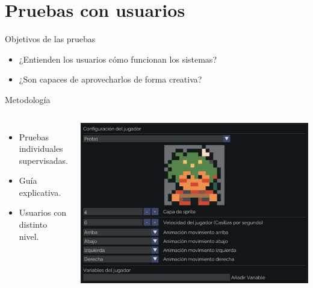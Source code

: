 \documentclass[aspectratio=169]{beamer}
\begin{document}
\section{Pruebas con usuarios}
\begin{frame}{Objetivos de las pruebas}
	\begin{itemize}
		\item ¿Entienden los usuarios cómo funcionan los sistemas?
		\item ¿Son capaces de aprovecharlos de forma creativa?
	\end{itemize}
\end{frame}
\begin{frame}{Metodología}
\begin{columns}
	\begin{itemize}
		\item Pruebas individuales supervisadas.
		\item Guía explicativa.
		\item Usuarios con distinto nivel.
	\end{itemize}
	\includegraphics[width=\textwidth]{imgs/pruebas/metodologia.pdf}
\end{columns}
\end{frame}
\end{document}
